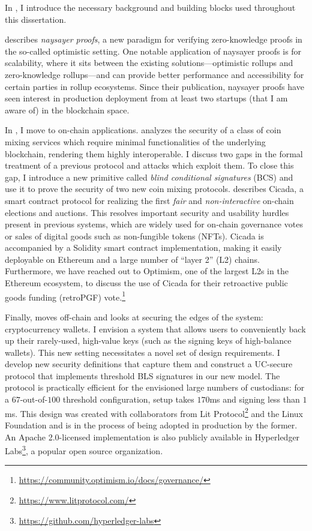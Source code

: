 In , I introduce the necessary background and building blocks used throughout this dissertation. 

 describes \emph{naysayer proofs}, a new paradigm for verifying zero-knowledge proofs in the so-called optimistic setting. One notable application of naysayer proofs is for scalability, where it sits between the existing solutions---optimistic rollups and zero-knowledge rollups---and can provide better performance and accessibility for certain parties in rollup ecosystems. Since their publication, naysayer proofs have seen interest in production deployment from at least two startups (that I am aware of) in the blockchain space. %

In , I move to on-chain applications. 
 analyzes the security of a class of coin mixing services which require minimal functionalities of the underlying blockchain, rendering them highly interoperable. I discuss two gaps in the formal treatment of a previous protocol and attacks which exploit them. To close this gap, I introduce a new primitive called \emph{blind conditional signatures} (BCS) and use it to prove the security of two new coin mixing protocols.
 describes Cicada, a smart contract protocol for realizing the first \emph{fair} and \emph{non-interactive} on-chain elections and auctions. This resolves important security and usability hurdles present in previous systems, which are widely used for on-chain governance votes or sales of digital goods such as non-fungible tokens (NFTs). Cicada is accompanied by a Solidity smart contract implementation, making it easily deployable on Ethereum and a large number of ``layer 2'' (L2) chains. Furthermore, we have reached out to Optimism, one of the largest L2s in the Ethereum ecosystem, to discuss the use of Cicada for their retroactive public goods funding (retroPGF) vote.\footnote{\url{https://community.optimism.io/docs/governance/}}

Finally,  moves off-chain and looks at securing the edges of the system: cryptocurrency wallets. I envision a system that allows users to conveniently back up their rarely-used, high-value keys (such as the signing keys of high-balance wallets). This new setting necessitates a novel set of design requirements. I develop new security definitions that capture them and construct a UC-secure protocol that implements threshold BLS signatures in our new model. The protocol is practically efficient for the envisioned large numbers of custodians: for a $67$-out-of-$100$ threshold configuration, setup takes $170$ms and signing less than $1$ms.
This design was created with collaborators from Lit Protocol\footnote{\url{https://www.litprotocol.com/}} and the Linux Foundation and is in the process of being adopted in production by the former. An Apache 2.0-licensed implementation is also publicly available in Hyperledger Labs\footnote{\url{https://github.com/hyperledger-labs}}, a popular open source organization.

